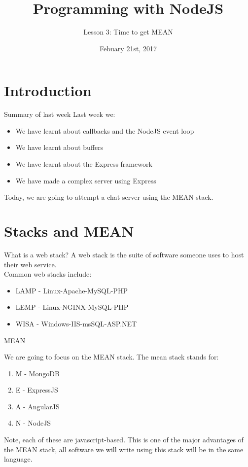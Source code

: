 \documentclass{beamer}
\title{Programming with NodeJS}
\subtitle{Lesson 3: Time to get MEAN}
\date{Febuary 21st, 2017}
\begin{document}
\begin{frame}
  \titlepage
\end{frame}


\section{Introduction}

\begin{frame}{Summary of last week}
  Last week we:
  \pause
  \begin{itemize}
  \item We have learnt about callbacks and the NodeJS event loop\pause
  \item We have learnt about buffers\pause
  \item We have learnt about the Express framework\pause
  \item We have made a complex server using Express\pause
  \end{itemize}
  \pause
  Today, we are going to attempt a chat server using the MEAN stack.
\end{frame}

\section{Stacks and MEAN}

\begin{frame}{What is a web stack?}
A web stack is the suite of software someone uses to host their web service.\\
\pause
Common web stacks include:
\begin{itemize}
  \item LAMP \pause - Linux-Apache-MySQL-PHP \pause
  \item LEMP \pause - Linux-NGINX-MySQL-PHP \pause
  \item WISA \pause - Windows-IIS-msSQL-ASP.NET
\end{itemize}

\end{frame}

\begin{frame}{MEAN}

We are going to focus on the MEAN stack. The mean stack stands for:\pause
\begin{enumerate}
  \item M \pause - MongoDB \pause
  \item E \pause - ExpressJS \pause
  \item A \pause - AngularJS \pause
  \item N \pause - NodeJS
\end{enumerate}
\pause
Note, each of these are javascript-based. This is one of the major advantages of the MEAN stack, all software we will write using this stack will be in the same language.
\end{frame}
\end{document}
